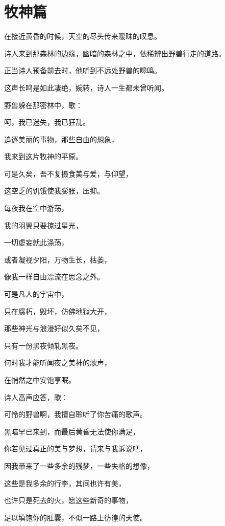 \documentclass[UTF8]{article}
\begin{document}
\section{牧神篇}
\par 在接近黄昏的时候，天空的尽头传来暧昧的叹息。
\par 诗人来到那森林的边缘，幽暗的森林之中，依稀辨出野兽行走的道路。
\par 正当诗人预备前去时，他听到不远处野兽的嗥鸣。
\par 这声长鸣是如此凄绝，婉转，诗人一生都未曾听闻。
\\[0.6cm]
\par 野兽躲在那密林中，歌：
\\[0.6cm]
\par 呵，我已迷失，我已狂乱。
\par 追逐美丽的事物，那些自由的想象，
\par 我来到这片牧神的平原。
\par 可是久矣，吾不复摄食美与爱，与仰望，
\par 这空乏的饥饿使我膨胀，压抑。
\par 每夜我在空中游荡，
\par 我的羽翼只要掠过星光，
\par 一切虚妄就此涤荡，
\par 或者凝视夕阳，万物生长，枯萎，
\par 像我一样自由漂流在思念之外。
\par 可是凡人的宇宙中，
\par 只在腐朽，毁坏，仿佛地狱大开，
\par 那些神光与浪漫好似久矣不见，
\par 只有一份黑夜倾轧黑夜。
\par 何时我才能听闻夜之美神的歌声，
\par 在悄然之中安饱享眠。
\\[0.6cm]
\par 诗人高声应答，歌：
\\[0.6cm]
\par 可怜的野兽啊，我擅自聆听了你苦痛的歌声。
\par 黑暗早已来到，而最后黄昏无法使你满足，
\par 你若见过真正的美与梦想，请来与我诉说吧，
\par 因我带来了一些多余的残梦，一些失格的想像，
\par 这些是我多余的行李，其间也许有美，
\par 也许只是死去的火，愿这些新奇的事物，
\par 足以填饱你的肚囊，不似一路上彷徨的天使。
\end{document}
